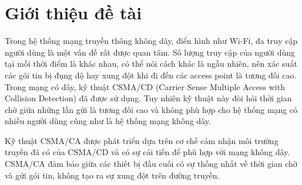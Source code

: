 %
\chapter{Giới thiệu đề tài}
Trong hệ thống mạng truyền thông không dây, điển hình như Wi-Fi, đa truy cập người dùng là một vấn đề rất được quan tâm. Số lượng truy cập của người dùng tại mỗi thời điểm là khác nhau, có thể nói cách khác là ngẫu nhiên, nên xác suất các gói tin bị đụng độ hay xung đột khi đi đến các access point là tương đối cao. Trong mạng có dây, kỹ thuật CSMA/CD (Carrier Sense Multiple Access with Collision Detection) đã được sử dụng. Tuy nhiên kỹ thuật này đòi hỏi thời gian chờ giữa những lần gửi là tương đối cao và không phù hợp cho hệ thống mạng có nhiều người dùng cũng như là hệ thống mạng không dây.

Kỹ thuật CSMA/CA được phát triển dựa trên cơ chế cảm nhận môi trường truyền đã có của CSMA/CD và có sự cải tiến để phù hợp với mạng không dây. CSMA/CA đảm bảo giữa các thiết bị đầu cuối có sự thống nhất về thời gian chờ và gửi gói tin, không tạo ra sự xung đột trên đường truyền.

